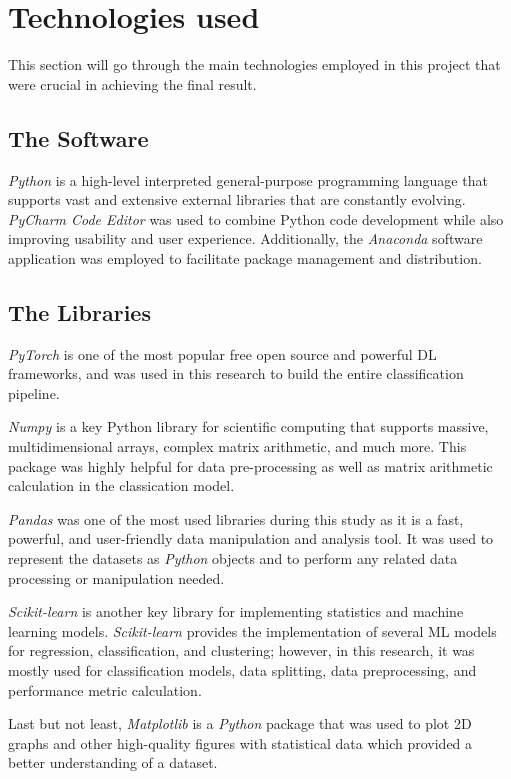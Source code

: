 \section{Technologies used}

This section will go through the main technologies employed in this project that were crucial in achieving the final result.

\subsection{The Software}

\textit{Python} is a high-level interpreted general-purpose programming language that supports vast and extensive external libraries that are constantly evolving. \textit{PyCharm Code Editor} was used to combine Python code development while also improving usability and user experience. Additionally, the \textit{Anaconda} software application was employed to facilitate package management and distribution.

\subsection{The Libraries}

\textit{PyTorch} is one of the most popular free open source and powerful \gls{DL} frameworks, and was used in this research to build the entire classification pipeline.

\textit{Numpy} is a key Python library for scientific computing that supports massive, multidimensional arrays, complex matrix arithmetic, and much more. This package was highly helpful for data pre-processing as well as matrix arithmetic calculation in the classication model.

\textit{Pandas} was one of the most used libraries during this study as it is a fast, powerful, and user-friendly data manipulation and analysis tool. It was used to represent the datasets as \textit{Python} objects and to perform any related data processing or manipulation needed.

\textit{Scikit-learn} is another key library for implementing statistics and machine learning models. \textit{Scikit-learn} provides the implementation of several ML models for regression, classification, and clustering; however, in this research, it was mostly used for classification models, data splitting, data preprocessing, and performance metric calculation.

Last but not least, \textit{Matplotlib} is a \textit{Python} package that was used to plot 2D graphs and other high-quality figures with statistical data which provided a better understanding of a dataset.